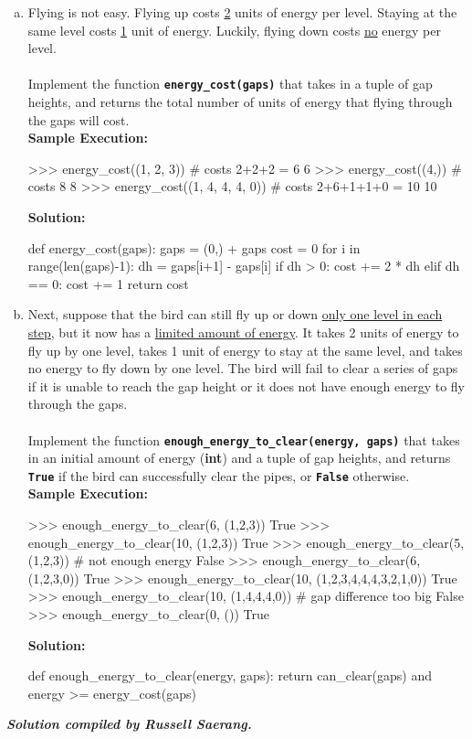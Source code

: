 \begin{enumerate}[(a)]
\item Flying is not easy. Flying up costs \underline{2} units of energy per level. Staying at the same level costs 
\underline{1} unit of energy. Luckily, flying down costs \underline{no} energy per level. \\ \\
Implement the function \texttt{\bfseries energy\_cost(gaps)} that takes in a tuple of gap heights, and
returns the total number of units of energy that flying through the gaps will cost. \\
\textbf{Sample Execution:}
\begin{python}
>>> energy_cost((1, 2, 3))          # costs 2+2+2 = 6
6
>>> energy_cost((4,))               # costs 8
8
>>> energy_cost((1, 4, 4, 4, 0))    # costs 2+6+1+1+0 = 10
10
\end{python}
\textbf{Solution:}
\begin{python}
def energy_cost(gaps):
    gaps = (0,) + gaps
    cost = 0
    for i in range(len(gaps)-1):
        dh = gaps[i+1] - gaps[i]
        if dh > 0:
            cost += 2 * dh
        elif dh == 0:
            cost += 1
    return cost
\end{python}

\item Next, suppose that the bird can still fly up or down \underline{only one level in each step}, but it now has
a \underline{limited amount of energy}. It takes 2 units of energy to fly up by one level, takes 1 unit of
energy to stay at the same level, and takes no energy to fly down by one level. The bird will fail
to clear a series of gaps if it is unable to reach the gap height or it does not have enough energy
to fly through the gaps. \\ \\
Implement the function \texttt{\bfseries enough\_energy\_to\_clear(energy, gaps)} that takes in an initial amount 
of energy (\textbf{int}) and a tuple of gap heights, and returns \texttt{\bfseries True} if the bird can successfully 
clear the pipes, or \texttt{\bfseries False} otherwise. \\
\textbf{Sample Execution:}
\begin{python}
>>> enough_energy_to_clear(6, (1,2,3))
True
>>> enough_energy_to_clear(10, (1,2,3))
True
>>> enough_energy_to_clear(5, (1,2,3))      # not enough energy
False
>>> enough_energy_to_clear(6, (1,2,3,0))
True
>>> enough_energy_to_clear(10, (1,2,3,4,4,4,3,2,1,0))
True
>>> enough_energy_to_clear(10, (1,4,4,4,0)) # gap difference too big
False
>>> enough_energy_to_clear(0, ())
True
\end{python}
\textbf{Solution:}
\begin{python}
def enough_energy_to_clear(energy, gaps):
    return can_clear(gaps) and energy >= energy_cost(gaps)
\end{python}
\end{enumerate}

\begin{flushright}
\vspace{2 cm}\textbf{\textit{Solution compiled by Russell Saerang.}}
\end{flushright}
